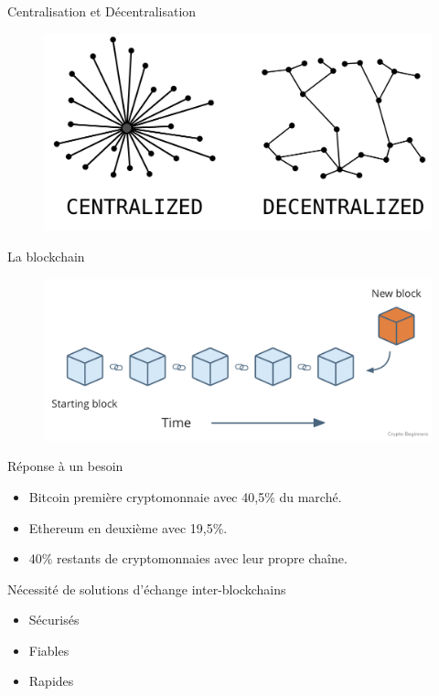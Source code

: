 \begin{frame}{Centralisation et Décentralisation}
    \begin{figure}
        \centering
        \includegraphics[scale = 0.2]{introduction/CentralDecentral.png}
    \end{figure}
\end{frame}

\begin{frame}{La blockchain}
    \begin{figure}
        \centering
        \includegraphics[scale = 0.3]{introduction/blockchain.png}
    \end{figure}
\end{frame}


\begin{frame}{Réponse à un besoin}
    \begin{block}{}
        \begin{itemize}
        \item Bitcoin première cryptomonnaie avec 40,5\% du marché.
        \item Ethereum en deuxième avec 19,5\%.
        \item 40\% restants de cryptomonnaies avec leur propre chaîne.
    \end{itemize}
    \end{block}
    \pause
    \begin{block}{Nécessité de solutions d'échange inter-blockchains}
        \begin{itemize}
            \item Sécurisés
            \item Fiables
            \item Rapides
        \end{itemize}
    \end{block}
    \end{frame}
